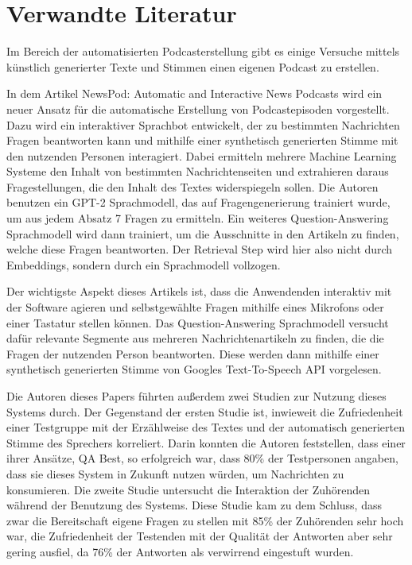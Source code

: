 \chapter{Verwandte Literatur}\label{ch:theoretical}

Im Bereich der automatisierten Podcasterstellung gibt es einige Versuche mittels künstlich generierter Texte und Stimmen einen eigenen Podcast zu erstellen.

In dem Artikel \glqq NewsPod: Automatic and Interactive News Podcasts\grqq{} wird ein neuer Ansatz für die automatische Erstellung von Podcastepisoden vorgestellt. 
Dazu wird ein interaktiver Sprachbot entwickelt, der zu bestimmten Nachrichten Fragen beantworten kann und mithilfe einer synthetisch generierten Stimme mit den nutzenden Personen interagiert.
Dabei ermitteln mehrere Machine Learning Systeme den Inhalt von bestimmten Nachrichtenseiten und extrahieren daraus Fragestellungen, die den Inhalt des Textes widerspiegeln sollen. 
Die Autoren benutzen ein GPT-2 Sprachmodell, das auf Fragengenerierung trainiert wurde, um aus jedem Absatz 7 Fragen zu ermitteln. 
Ein weiteres Question-Answering Sprachmodell wird dann trainiert, um die Ausschnitte in den Artikeln zu finden, welche diese Fragen beantworten.  
Der Retrieval Step wird hier also nicht durch Embeddings, sondern durch ein Sprachmodell vollzogen.

Der wichtigste Aspekt dieses Artikels ist, dass die Anwendenden interaktiv mit der Software agieren und selbstgewählte Fragen mithilfe eines Mikrofons oder einer Tastatur stellen können.
Das Question-Answering Sprachmodell versucht dafür relevante Segmente aus mehreren Nachrichtenartikeln zu finden, die die Fragen der nutzenden Person beantworten.
Diese werden dann mithilfe einer synthetisch generierten Stimme von Googles Text-To-Speech API vorgelesen.

Die Autoren dieses Papers führten außerdem zwei Studien zur Nutzung dieses Systems durch.
Der Gegenstand der ersten Studie ist, inwieweit die Zufriedenheit einer Testgruppe mit der Erzählweise des Textes und der automatisch generierten Stimme des Sprechers korreliert. 
Darin konnten die Autoren feststellen, dass einer ihrer Ansätze, QA Best, so erfolgreich war, dass 80\% der Testpersonen angaben, dass sie dieses System in Zukunft nutzen würden, um Nachrichten zu konsumieren.
Die zweite Studie untersucht die Interaktion der Zuhörenden während der Benutzung des Systems. 
Diese Studie kam zu dem Schluss, dass zwar die Bereitschaft eigene Fragen zu stellen mit 85\% der Zuhörenden sehr hoch war, die Zufriedenheit der Testenden mit der Qualität der Antworten aber sehr gering ausfiel, da 76\% der Antworten als verwirrend eingestuft wurden. 
\cite{laban2022}


